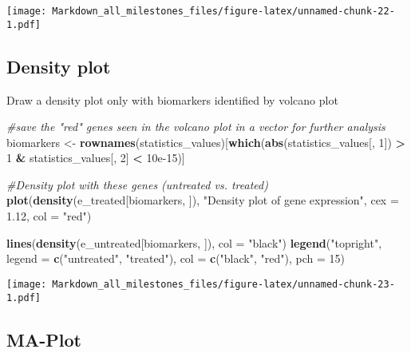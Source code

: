 \documentclass[]{article}
\newenvironment{Shaded}{\begin{snugshade}}{\end{snugshade}}
\newcommand{\CommentTok}[1]{\textcolor[rgb]{0.56,0.35,0.01}{\textit{#1}}}
\newcommand{\DataTypeTok}[1]{\textcolor[rgb]{0.13,0.29,0.53}{#1}}
\newcommand{\DecValTok}[1]{\textcolor[rgb]{0.00,0.00,0.81}{#1}}
\newcommand{\FloatTok}[1]{\textcolor[rgb]{0.00,0.00,0.81}{#1}}
\newcommand{\KeywordTok}[1]{\textcolor[rgb]{0.13,0.29,0.53}{\textbf{#1}}}
\newcommand{\NormalTok}[1]{#1}
\newcommand{\OperatorTok}[1]{\textcolor[rgb]{0.81,0.36,0.00}{\textbf{#1}}}
\newcommand{\StringTok}[1]{\textcolor[rgb]{0.31,0.60,0.02}{#1}}
\begin{document}
\texttt{[image: Markdown\_all\_milestones\_files/figure-latex/unnamed-chunk-22-1.pdf]}

\hypertarget{density-plot-1}{%
\subsection{Density plot}\label{density-plot-1}}

Draw a density plot only with biomarkers identified by volcano plot

\begin{Shaded}
\begin{Highlighting}[]
\CommentTok{#save the "red" genes seen in the volcano plot in a vector for further analysis}
\NormalTok{biomarkers <-}\StringTok{ }\KeywordTok{rownames}\NormalTok{(statistics_values)[}\KeywordTok{which}\NormalTok{(}\KeywordTok{abs}\NormalTok{(statistics_values[, }\DecValTok{1}\NormalTok{]) }\OperatorTok{>}\StringTok{ }\DecValTok{1} 
                                                   \OperatorTok{&}\StringTok{ }\NormalTok{statistics_values[, }\DecValTok{2}\NormalTok{] }\OperatorTok{<}\StringTok{ }\FloatTok{10e-15}\NormalTok{)]}

\CommentTok{#Density plot with these genes (untreated vs. treated)}
\KeywordTok{plot}\NormalTok{(}\KeywordTok{density}\NormalTok{(e_treated[biomarkers, ]), }\StringTok{"Density plot of gene expression"}\NormalTok{, }\DataTypeTok{cex =} \FloatTok{1.12}\NormalTok{, }\DataTypeTok{col =} \StringTok{"red"}\NormalTok{)}

\KeywordTok{lines}\NormalTok{(}\KeywordTok{density}\NormalTok{(e_untreated[biomarkers, ]), }\DataTypeTok{col =} \StringTok{"black"}\NormalTok{)}
\KeywordTok{legend}\NormalTok{(}\StringTok{"topright"}\NormalTok{, }\DataTypeTok{legend =} \KeywordTok{c}\NormalTok{(}\StringTok{"untreated"}\NormalTok{, }\StringTok{"treated"}\NormalTok{), }\DataTypeTok{col =} \KeywordTok{c}\NormalTok{(}\StringTok{"black"}\NormalTok{, }\StringTok{"red"}\NormalTok{), }\DataTypeTok{pch =} \DecValTok{15}\NormalTok{)}
\end{Highlighting}
\end{Shaded}

\texttt{[image: Markdown\_all\_milestones\_files/figure-latex/unnamed-chunk-23-1.pdf]}

\hypertarget{ma-plot}{%
\subsection{MA-Plot}\label{ma-plot}}
\end{document}
